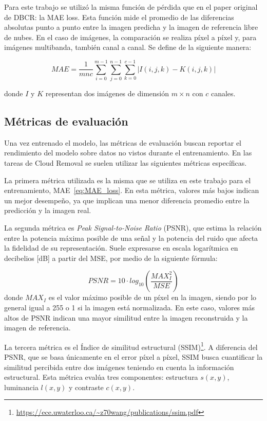 Para este trabajo se utilizó la misma función de pérdida que en el paper original de DBCR: la MAE loss. Esta función mide el promedio de las diferencias absolutas punto a punto entre la imagen predicha y la imagen de referencia libre de nubes. En el caso de imágenes, la comparación se realiza píxel a píxel y, para imágenes multibanda, también canal a canal. Se define de la siguiente manera:

\begin{equation}
MAE=\frac{1}{mnc}\sum_{i=0}^{m-1}\sum_{j=0}^{n-1}\sum_{k=0}^{c-1}|I(i,j,k)-K(i,j,k)|
\label{eq:MAE_loss}
\end{equation}

donde $I$ y $K$ representan dos imágenes de dimensión $m \times n$ con $c$ canales.

\subsection{Métricas de evaluación}

Una vez entrenado el modelo, las métricas de evaluación buscan reportar el rendimiento del modelo sobre datos no vistos durante el entrenamiento. En las tareas de Cloud Removal se suelen utilizar las siguientes métricas específicas.

La primera métrica utilizada es la misma que se utiliza en este trabajo para el entrenamiento, MAE~\eqref{eq:MAE_loss}. En esta métrica, valores más bajos indican un mejor desempeño, ya que implican una menor diferencia promedio entre la predicción y la imagen real.

La segunda métrica es \textit{Peak Signal-to-Noise Ratio} (PSNR), que estima la relación entre la potencia máxima posible de una señal y la potencia del ruido que afecta la fidelidad de su representación. Suele expresarse en escala logarítmica en decibelios [dB] a partir del MSE, por medio de la siguiente fórmula:

\begin{equation}
    PSNR=10 \cdot log_{10}(\frac{MAX_I^{2}}{MSE}) 
    \label{PSNR}
\end{equation}
donde $MAX_I$ es el valor máximo posible de un píxel en la imagen, siendo por lo general igual a 255 o 1 si la imagen está normalizada. En este caso, valores más altos de PSNR indican una mayor similitud entre la imagen reconstruida y la imagen de referencia.

La tercera métrica es el Índice de similitud estructural (SSIM)\footnote{\url{https://ece.uwaterloo.ca/~z70wang/publications/ssim.pdf}}. A diferencia del PSNR, que se basa únicamente en el error píxel a píxel, SSIM busca cuantificar la similitud percibida entre dos imágenes teniendo en cuenta la información estructural. Esta métrica evalúa tres componentes: estructura $s(x,y)$, luminancia $l(x,y)$ y contraste $c(x,y)$.

